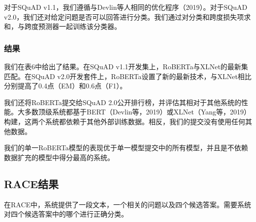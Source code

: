 \documentclass[lang=cn,11pt,a4paper,twocolumn]{elegantpaper}
\begin{document}
对于SQuAD v1.1，我们遵循与Devlin等人相同的优化程序（2019）。对于SQuAD v2.0，我们还对给定问题是否可以回答进行分类。我们通过对分类和跨度损失项求和，与跨度预测器一起训练该分类器。

\subsubsection*{结果}
我们在表6中给出了结果。在SQuAD v1.1开发集上，RoBERTa与XLNet的最新集匹配。在SQuAD v2.0开发套件上，RoBERTa设置了新的最新技术，与XLNet相比分别提高了0.4点（EM）和0.6点（F1）。

我们还将RoBERTa提交给SQuAD 2.0公开排行榜，并评估其相对于其他系统的性能。大多数顶级系统都基于BERT（Devlin等，2019）或XLNet（Yang等，2019）构建，这两个系统都依赖于其他外部训练数据。相反，我们的提交没有使用任何其他数据。

我们的单一RoBERTa模型的表现优于单一模型提交中的所有模型，并且是不依赖数据扩充的模型中得分最高的系统。


\subsection{RACE结果}
在RACE中，系统提供了一段文本，一个相关的问题以及四个候选答案。需要系统对四个候选答案中的哪个进行正确分类。
\

\nocite{*}

\end{document}
